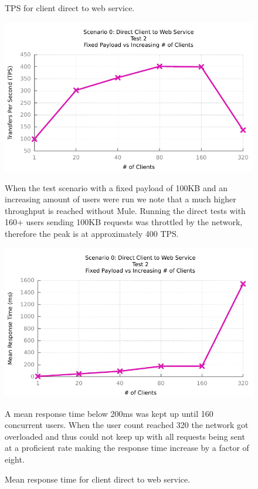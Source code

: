 \begin{figure}[H]
	\caption{TPS for client direct to web service.}
	\centerline{\includegraphics{img/direct_fp_iu_tps}}
	\label{fig:direct-2-1}
	When the test scenario with a fixed payload of 100KB and an increasing amount of users were run we note that a much higher throughput is reached without Mule.
	Running the direct tests with 160+ users sending 100KB requests was throttled by the network, therefore the peak is at approximately 400 TPS. 

	\caption{Mean response time for client direct to web service.}
	\centerline{\includegraphics{img/direct_fp_iu_resp}}
	\label{fig:direct-2-2}
	A mean response time below 200ms was kept up until 160 concurrent users. When the user count reached 320 the network got overloaded and thus could not keep up with all requests being sent at a proficient rate making the response time increase by a factor of eight.
\end{figure}

